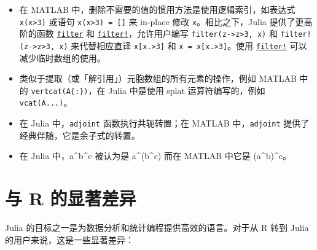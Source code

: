 \begin{itemize}
\item 在 MATLAB 中，删除不需要的值的惯用方法是使用逻辑索引，如表达式 \texttt{x(x>3)} 或语句 \texttt{x(x>3) = []} 来 in-place 修改 \texttt{x}。相比之下，Julia 提供了更高阶的函数 \hyperlink{11445961893478569145}{\texttt{filter}} 和 \hyperlink{3384092630307389071}{\texttt{filter!}}，允许用户编写 \texttt{filter(z->z>3, x)} 和 \texttt{filter!(z->z>3, x)} 来代替相应直译 \texttt{x[x.>3]} 和 \texttt{x = x[x.>3]}。使用 \hyperlink{3384092630307389071}{\texttt{filter!}} 可以减少临时数组的使用。


\item 类似于提取（或「解引用」）元胞数组的所有元素的操作，例如 MATLAB 中的 \texttt{vertcat(A\{:\})}，在 Julia 中是使用 splat 运算符编写的，例如 \texttt{vcat(A...)}。


\item 在 Julia 中，\texttt{adjoint} 函数执行共轭转置；在 MATLAB 中，\texttt{adjoint} 提供了经典伴随，它是余子式的转置。


\item 在 Julia 中，a{\textasciicircum}b{\textasciicircum}c 被认为是 a{\textasciicircum}(b{\textasciicircum}c) 而在 MATLAB 中它是 (a{\textasciicircum}b){\textasciicircum}c。

\end{itemize}


\hypertarget{2824295160422151139}{}


\section{与 R 的显著差异}



Julia 的目标之一是为数据分析和统计编程提供高效的语言。对于从 R 转到 Julia 的用户来说，这是一些显著差异：



